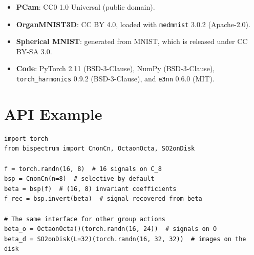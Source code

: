 \documentclass{article}
\theoremstyle{definition}
\theoremstyle{remark}
\theoremstyle{definition}
\begin{document}
\begin{itemize}[nosep]
  \item \textbf{PCam}: CC0 1.0 Universal (public domain).
  \item \textbf{OrganMNIST3D}: CC BY 4.0, loaded with \texttt{medmnist} 3.0.2 (Apache-2.0).
  \item \textbf{Spherical MNIST}: generated from MNIST, which is released under CC BY-SA 3.0.
  \item \textbf{Code}: PyTorch 2.11 (BSD-3-Clause), NumPy (BSD-3-Clause),
    \texttt{torch\_harmonics} 0.9.2 (BSD-3-Clause), and \texttt{e3nn} 0.6.0 (MIT).
\end{itemize}

\section{API Example}
\label{app:api-example}

\begin{lstlisting}
import torch
from bispectrum import CnonCn, OctaonOcta, SO2onDisk

f = torch.randn(16, 8)  # 16 signals on C_8
bsp = CnonCn(n=8)  # selective by default
beta = bsp(f)  # (16, 8) invariant coefficients
f_rec = bsp.invert(beta)  # signal recovered from beta

# The same interface for other group actions
beta_o = OctaonOcta()(torch.randn(16, 24))  # signals on O
beta_d = SO2onDisk(L=32)(torch.randn(16, 32, 32))  # images on the disk
\end{lstlisting}

\clearpage

\end{document}
